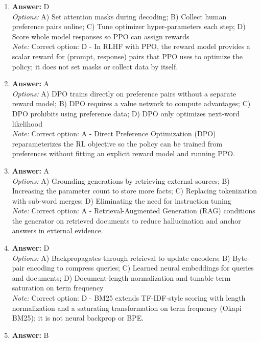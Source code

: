\documentclass[12pt]{article}
\begin{document}
\begin{enumerate}[label=Q\arabic*.]
\\ \textit{Note:} Correct option: A - Pairwise comparisons (which response is better?) are often more reliable and scalable than scoring absolute quality, and they encode relative preference for alignment.
\item \textbf{Answer:} D
\\ \textit{Options:} A) Set attention masks during decoding; B) Collect human preference pairs online; C) Tune optimizer hyper-parameters each step; D) Score whole model responses so PPO can assign rewards
\\ \textit{Note:} Correct option: D - In RLHF with PPO, the reward model provides a scalar reward for (prompt, response) pairs that PPO uses to optimize the policy; it does not set masks or collect data by itself.
\item \textbf{Answer:} A
\\ \textit{Options:} A) DPO trains directly on preference pairs without a separate reward model; B) DPO requires a value network to compute advantages; C) DPO prohibits using preference data; D) DPO only optimizes next-word likelihood
\\ \textit{Note:} Correct option: A - Direct Preference Optimization (DPO) reparameterizes the RL objective so the policy can be trained from preferences without fitting an explicit reward model and running PPO.
\item \textbf{Answer:} A
\\ \textit{Options:} A) Grounding generations by retrieving external sources; B) Increasing the parameter count to store more facts; C) Replacing tokenization with sub-word merges; D) Eliminating the need for instruction tuning
\\ \textit{Note:} Correct option: A - Retrieval-Augmented Generation (RAG) conditions the generator on retrieved documents to reduce hallucination and anchor answers in external evidence.
\item \textbf{Answer:} D
\\ \textit{Options:} A) Backpropagates through retrieval to update encoders; B) Byte-pair encoding to compress queries; C) Learned neural embeddings for queries and documents; D) Document-length normalization and tunable term saturation on term frequency
\\ \textit{Note:} Correct option: D - BM25 extends TF-IDF-style scoring with length normalization and a saturating transformation on term frequency (Okapi BM25); it is not neural backprop or BPE.
\item \textbf{Answer:} B

\end{enumerate}
\end{document}
